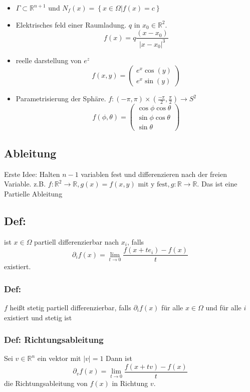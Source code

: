 \begin{itemize}
	\item $\Gamma \subset \mathbb R^{n+1}$ und $N_f(x) =\left\{x\in\Omega|f(x) = c\right\}$
	\item Elektrisches feld einer Raumladung. $q$ in $x_0\in\mathbb R^2$.
		$$
		f(x) = q\frac{(x-x_0)}{|x-x_0|^3}
		$$
	\item reelle darstellung von $e^z$
		\begin{equation}
			f(x,y) = 
			\begin{pmatrix}
				e^x\cos(y)\\
				e^x\sin(y)
			\end{pmatrix}
		\end{equation}
	\item Parametrisierung der Sphäre. $f:(-\pi,\pi)\times(\frac{-\pi}{2},\frac{\pi}{2})\rightarrow S^2$
		$$
		f(\phi,\theta)=
		\begin{pmatrix}
			\cos\phi\cos\theta\\
			\sin\phi\cos\theta\\
			\sin\theta
		\end{pmatrix}
		$$
\end{itemize}

\subsection{Ableitung}
Erste Idee: Halten $n-1$ variablen fest und differenzieren nach der freien Variable. z.B.
$f:\mathbb R^2 \rightarrow \mathbb R, g(x) = f(x,y)\text{ mit y fest}, g:\mathbb R \rightarrow \mathbb R$.
Das ist eine Partielle Ableitung
\subsection{Def: }
ist $x\in\Omega$ partiell differenzierbar nach $x_i$, falls
\begin{equation}
	\partial_i f(x) = \lim_{t\rightarrow 0}\frac{f(x+te_i) -f(x)}{t}
\end{equation}
existiert.

\subsubsection{Def: }
$f$ heißt stetig partiell differenzierbar, falls $\partial_i f(x)$ für alle $x\in\Omega$ und für alle $i$ existiert und stetig ist

\subsubsection{Def: Richtungsableitung}
Sei $v\in\mathbb R^n$ ein vektor mit $|v| = 1$ Dann ist
\begin{equation}
	\partial_v f(x) = \lim_{t\rightarrow 0} \frac{f(x+tv) - f(x)}{t}
\end{equation}
die Richtungsableitung von $f(x)$ in Richtung $v$.

